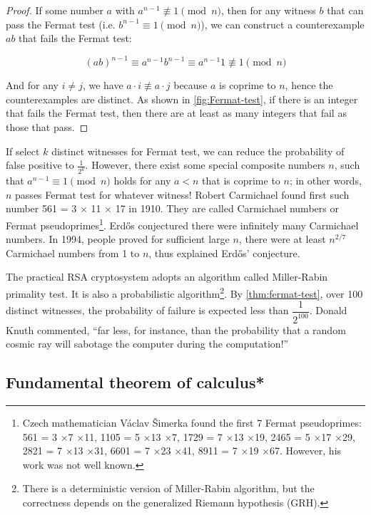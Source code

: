 \documentclass[b5paper]{article}
\begin{document}
\begin{proof}
If some number $a$ with $a^{n-1} \not\equiv 1 \pmod n$, then for any witness $b$ that can pass the Fermat test (i.e. $b^{n-1} \equiv 1 \pmod n$), we can construct a counterexample $ab$ that fails the Fermat test:

\[
(ab)^{n-1} \equiv a^{n-1}b^{n-1} \equiv a^{n-1}1 \not\equiv 1 \pmod n
\]

And for any $i \ne j$, we have $a \cdot i \not\equiv a \cdot j$ because $a$ is coprime to $n$, hence the counterexamples are distinct. As shown in \cref{fig:Fermat-test}, if there is an integer that fails the Fermat test, then there are at least as many integers that fail as those that pass.
\end{proof}

If select $k$ distinct witnesses for Fermat test, we can reduce the probability of false positive to $\frac{1}{2^k}$. However, there exist some special composite numbers $n$, such that $a^{n-1} \equiv 1 \pmod n$ holds for any $a < n$ that is coprime to $n$; in other words, $n$ passes Fermat test for whatever witness! Robert Carmichael found first such number 561 = 3 $\times$ 11 $\times$ 17 in 1910. They are called Carmichael numbers or Fermat pseudoprimes\footnote{Czech mathematician Václav Šimerka found the first 7 Fermat pseudoprimes: 561 = 3 $\times$7 $\times$11, 1105 = 5 $\times$13 $\times$7, 1729 = 7 $\times$13 $\times$19, 2465 = 5 $\times$17 $\times$29, 2821 = 7 $\times$13 $\times$31, 6601 = 7 $\times$23 $\times$41, 8911 = 7 $\times$19 $\times$67. However, his work was not well known.}. Erdős conjectured there were infinitely many Carmichael numbers. In 1994, people proved for sufficient large $n$, there were at least $n^{2/7}$ Carmichael numbers from 1 to $n$, thus explained Erdős' conjecture\cite{Carmichael-number}.

The practical RSA cryptosystem adopts an algorithm called Miller-Rabin primality test. It is also a probabilistic algorithm\footnote{There is a deterministic version of Miller-Rabin algorithm, but the correctness depends on the generalized Riemann hypothesis (GRH)\cite{Miller-1976}.}. By \cref{thm:fermat-test}, over 100 distinct witnesses, the probability of failure is expected less than $\dfrac{1}{2^{100}}$. Donald Knuth commented, \enquote{far less, for instance, than the probability that a random cosmic ray will sabotage the computer during the computation!}

\subsection{Fundamental theorem of calculus*}
\end{document}
